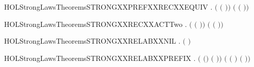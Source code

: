 \newcommand{\HOLStrongLawsTheoremsSTRONGXXPARXXTAUXXTAU}{\UseVerbatim{HOLStrongLawsTheoremsSTRONGXXPARXXTAUXXTAU}}
\begin{SaveVerbatim}{HOLStrongLawsTheoremsSTRONGXXPREFXXRECXXEQUIV}
\HOLTokenTurnstile{} \HOLSymConst{\HOLTokenForall{}}  .
        \ensuremath{(}\HOLSymConst{\ensuremath{\ldotp}}  \ensuremath{(}\HOLSymConst{\ensuremath{\ldotp}}\HOLSymConst{\ensuremath{\ldotp}} \ensuremath{)}\ensuremath{)} \ensuremath{(}  \ensuremath{(}\HOLSymConst{\ensuremath{\ldotp}}\HOLSymConst{\ensuremath{\ldotp}} \ensuremath{)}\ensuremath{)}
\end{SaveVerbatim}
\newcommand{\HOLStrongLawsTheoremsSTRONGXXPREFXXRECXXEQUIV}{\UseVerbatim{HOLStrongLawsTheoremsSTRONGXXPREFXXRECXXEQUIV}}
\begin{SaveVerbatim}{HOLStrongLawsTheoremsSTRONGXXRECXXACTTwo}
\HOLTokenTurnstile{} \HOLSymConst{\HOLTokenForall{}} .  \ensuremath{(}  \ensuremath{(}\HOLSymConst{\ensuremath{\ldotp}}\HOLSymConst{\ensuremath{\ldotp}} \ensuremath{)}\ensuremath{)} \ensuremath{(}  \ensuremath{(}\HOLSymConst{\ensuremath{\ldotp}} \ensuremath{)}\ensuremath{)}
\end{SaveVerbatim}
\newcommand{\HOLStrongLawsTheoremsSTRONGXXRECXXACTTwo}{\UseVerbatim{HOLStrongLawsTheoremsSTRONGXXRECXXACTTwo}}
\begin{SaveVerbatim}{HOLStrongLawsTheoremsSTRONGXXRELABXXNIL}
\HOLTokenTurnstile{} \HOLSymConst{\HOLTokenForall{}}.  \ensuremath{(}  \ensuremath{)} 
\end{SaveVerbatim}
\newcommand{\HOLStrongLawsTheoremsSTRONGXXRELABXXNIL}{\UseVerbatim{HOLStrongLawsTheoremsSTRONGXXRELABXXNIL}}
\begin{SaveVerbatim}{HOLStrongLawsTheoremsSTRONGXXRELABXXPREFIX}
\HOLTokenTurnstile{} \HOLSymConst{\HOLTokenForall{}}  .
        \ensuremath{(} \ensuremath{(}\HOLSymConst{\ensuremath{\ldotp}}\ensuremath{)} \ensuremath{(} \ensuremath{)}\ensuremath{)}
         \ensuremath{(} \ensuremath{(} \ensuremath{)} \HOLSymConst{\ensuremath{\ldotp}}  \ensuremath{(} \ensuremath{)}\ensuremath{)}
\end{SaveVerbatim}

